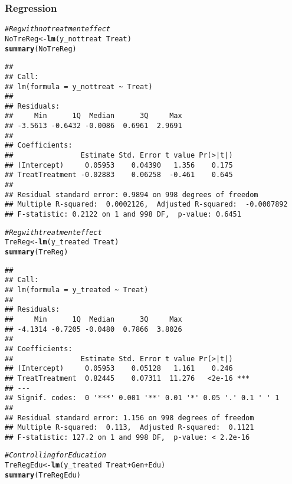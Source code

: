 \documentclass[11pt, a4paper]{article}\usepackage[]{graphicx}\usepackage[]{color}
\makeatletter
\newcommand{\hlcom}[1]{\textcolor[rgb]{0.678,0.584,0.686}{\textit{#1}}}%
\newcommand{\hlopt}[1]{\textcolor[rgb]{0,0,0}{#1}}%
\newcommand{\hlstd}[1]{\textcolor[rgb]{0.345,0.345,0.345}{#1}}%
\newcommand{\hlkwb}[1]{\textcolor[rgb]{0.69,0.353,0.396}{#1}}%
\newcommand{\hlkwd}[1]{\textcolor[rgb]{0.737,0.353,0.396}{\textbf{#1}}}%
\newenvironment{kframe}{%
 \def\at@end@of@kframe{}%
 \ifinner\ifhmode%
  \def\at@end@of@kframe{\end{minipage}}%
  \begin{minipage}{\columnwidth}%
 \fi\fi%
 \def\FrameCommand##1{\hskip\@totalleftmargin \hskip-\fboxsep
 \colorbox{shadecolor}{##1}\hskip-\fboxsep
     \hskip-\linewidth \hskip-\@totalleftmargin \hskip\columnwidth}%
 \MakeFramed {\advance\hsize-\width
   \@totalleftmargin\z@ \linewidth\hsize
   \@setminipage}}%
 {\par\unskip\endMakeFramed%
 \at@end@of@kframe}
\newenvironment{knitrout}{}{} %
\makeatother
\begin{document}
\clearpage

    \subsubsection{Regression}

\begin{knitrout}
\color{fgcolor}\begin{kframe}
\begin{alltt}
  \hlcom{#Reg with no treatment effect}
  \hlstd{NoTreReg} \hlkwb{<-} \hlkwd{lm}\hlstd{(y_nottreat} \hlopt{~} \hlstd{Treat)}
  \hlkwd{summary}\hlstd{(NoTreReg)}
\end{alltt}
\begin{verbatim}
## 
## Call:
## lm(formula = y_nottreat ~ Treat)
## 
## Residuals:
##     Min      1Q  Median      3Q     Max 
## -3.5613 -0.6432 -0.0086  0.6961  2.9691 
## 
## Coefficients:
##                Estimate Std. Error t value Pr(>|t|)
## (Intercept)     0.05953    0.04390   1.356    0.175
## TreatTreatment -0.02883    0.06258  -0.461    0.645
## 
## Residual standard error: 0.9894 on 998 degrees of freedom
## Multiple R-squared:  0.0002126,	Adjusted R-squared:  -0.0007892 
## F-statistic: 0.2122 on 1 and 998 DF,  p-value: 0.6451
\end{verbatim}
\begin{alltt}
  \hlcom{#Reg with treatment effect}
  \hlstd{TreReg} \hlkwb{<-} \hlkwd{lm}\hlstd{(y_treated} \hlopt{~} \hlstd{Treat)}
  \hlkwd{summary}\hlstd{(TreReg)}
\end{alltt}
\begin{verbatim}
## 
## Call:
## lm(formula = y_treated ~ Treat)
## 
## Residuals:
##     Min      1Q  Median      3Q     Max 
## -4.1314 -0.7205 -0.0480  0.7866  3.8026 
## 
## Coefficients:
##                Estimate Std. Error t value Pr(>|t|)    
## (Intercept)     0.05953    0.05128   1.161    0.246    
## TreatTreatment  0.82445    0.07311  11.276   <2e-16 ***
## ---
## Signif. codes:  0 '***' 0.001 '**' 0.01 '*' 0.05 '.' 0.1 ' ' 1
## 
## Residual standard error: 1.156 on 998 degrees of freedom
## Multiple R-squared:  0.113,	Adjusted R-squared:  0.1121 
## F-statistic: 127.2 on 1 and 998 DF,  p-value: < 2.2e-16
\end{verbatim}
\begin{alltt}
  \hlcom{#Controlling for Education}
  \hlstd{TreRegEdu} \hlkwb{<-} \hlkwd{lm}\hlstd{(y_treated} \hlopt{~} \hlstd{Treat} \hlopt{+} \hlstd{Gen} \hlopt{+} \hlstd{Edu)}
  \hlkwd{summary}\hlstd{(TreRegEdu)}

\end{alltt}
\end{kframe}
\end{knitrout}
\end{document}
